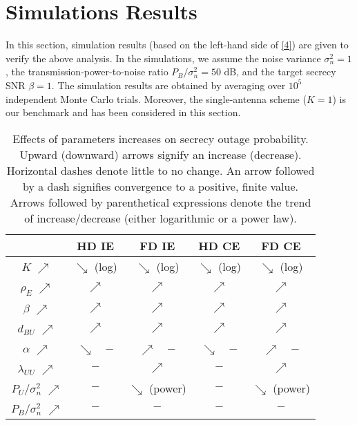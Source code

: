 \documentclass[10pt]{IEEEtran}
\begin{document}
\section{Simulations Results} \label{sec:sim}
In this section, simulation results (based on the left-hand side of \eqref{4}) are given to verify the above analysis. In the simulations, we assume the noise variance $\sigma_{n}^{2} = 1$, the transmission-power-to-noise ratio $P_B/\sigma^2_n = 50$ dB, and the target secrecy SNR $\beta = 1$. The simulation results are obtained by averaging over $10^5$ independent Monte Carlo trials. Moreover, the single-antenna scheme ($K = 1$) is our benchmark and has been considered in this section.


\begin{table}[!t]\small
\centering
\caption{Effects of parameters increases on secrecy outage probability. Upward (downward) arrows signify an increase (decrease). Horizontal dashes denote little to no change. An arrow followed by a dash signifies convergence to a positive, finite value. Arrows followed by parenthetical expressions denote the trend of increase/decrease (either logarithmic or a power law).}
\begin{tabular}{|c|c|c|c|c|}
\hline
                & HD IE& FD IE  & HD CE   & FD CE               \\ \hline
$K$  $\nearrow$    &   $\searrow$ (log) &  $\searrow$ (log)  & $\searrow$ (log) & $\searrow$ (log)  \\ \hline
$\rho_E$ $\nearrow$ &  $\nearrow$ &  $\nearrow$   & $\nearrow$  & $\nearrow$   \\ \hline
$\beta$  $\nearrow$ &  $\nearrow$ &  $\nearrow$   & $\nearrow$  & $\nearrow$   \\ \hline
$d_{BU}$  $\nearrow$ &  $\nearrow$ &  $\nearrow$   & $\nearrow$  & $\nearrow$   \\ \hline
$\alpha$  $\nearrow$&  $\searrow$~~$-$ &  $\nearrow$~~$-$  & $\searrow$~~$-$  & $\nearrow$~~$-$   \\ \hline
$\lambda_{UU}$  $\nearrow$&  $-$ &  $\nearrow$   & $-$  & $\nearrow$   \\ \hline
$P_U/\sigma_n^2$  $\nearrow$   &  $-$ &  $\searrow$ (power)   & $-$  & $\searrow$ (power)   \\ \hline
$P_B/\sigma_n^2$  $\nearrow$   &  $-$ &  $-$   & $-$  & $-$   \\ \hline
\end{tabular}
\end{table}
\end{document}
